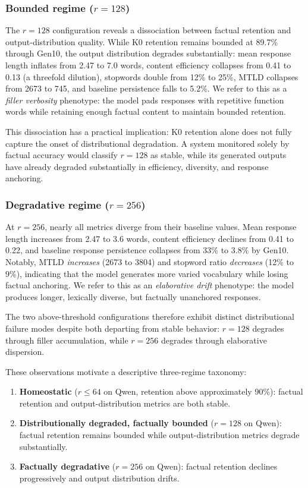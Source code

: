 \documentclass[a4paper,fleqn]{cas-dc}
\begin{document}
\subsubsection{Bounded regime ($r=128$)}\label{sec:dissociation}
The $r=128$ configuration reveals a dissociation between factual retention and
output-distribution quality. While K0 retention remains bounded at 89.7\% through
Gen10, the output distribution degrades substantially: mean response length
inflates from 2.47 to 7.0 words, content efficiency collapses from 0.41 to 0.13
(a threefold dilution), stopwords double from 12\% to 25\%, MTLD collapses from
2673 to 745, and baseline persistence falls to 5.2\%. We refer to this as a
\textit{filler verbosity} phenotype: the model pads responses with repetitive
function words while retaining enough factual content to maintain bounded
retention.

This dissociation has a practical implication: K0 retention alone does not fully
capture the onset of distributional degradation. A system monitored solely by
factual accuracy would classify $r=128$ as stable, while its generated outputs
have already degraded substantially in efficiency, diversity, and response
anchoring.

\subsubsection{Degradative regime ($r=256$)}
At $r=256$, nearly all metrics diverge from their baseline values. Mean response
length increases from 2.47 to 3.6 words, content efficiency declines from 0.41
to 0.22, and baseline response persistence collapses from 33\% to 3.8\% by
Gen10. Notably, MTLD \textit{increases} (2673 to 3804) and stopword ratio
\textit{decreases} (12\% to 9\%), indicating that the model generates more
varied vocabulary while losing factual anchoring. We refer to this as an
\textit{elaborative drift} phenotype: the model produces longer, lexically
diverse, but factually unanchored responses.

The two above-threshold configurations therefore exhibit distinct distributional
failure modes despite both departing from stable behavior: $r=128$ degrades
through filler accumulation, while $r=256$ degrades through elaborative
dispersion.

These observations motivate a descriptive three-regime taxonomy:

\begin{enumerate}
    \item \textbf{Homeostatic} ($r \leq 64$ on Qwen, retention above
    approximately 90\%): factual retention and output-distribution metrics are
    both stable.
    \item \textbf{Distributionally degraded, factually bounded} ($r=128$ on
    Qwen): factual retention remains bounded while output-distribution metrics
    degrade substantially.
    \item \textbf{Factually degradative} ($r=256$ on Qwen): factual retention
    declines progressively and output distribution drifts.
\end{enumerate}
\end{document}
